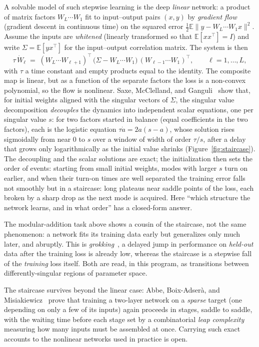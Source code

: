 A solvable model of such stepwise learning is the deep \emph{linear} network: a product of matrix factors $W_L\cdots W_1$ fit to input--output pairs $(x,y)$ by \emph{gradient flow} (gradient descent in continuous time) on the squared error $\tfrac12\mathbb{E}\|y-W_L\cdots W_1x\|^2$. Assume the inputs are \emph{whitened} (linearly transformed so that $\mathbb{E}[xx^\top]=I$) and write $\Sigma=\mathbb{E}[yx^\top]$ for the input--output correlation matrix. The system is then
\[
   \tau\,\dot W_\ell \;=\; (W_L\cdots W_{\ell+1})^{\top}\,\bigl(\Sigma-W_L\cdots W_1\bigr)\,(W_{\ell-1}\cdots W_1)^{\top},\qquad \ell=1,\dots,L,
\]
with $\tau$ a time constant and empty products equal to the identity. The composite map is linear, but as a function of the separate factors the loss is a non-convex polynomial, so the flow is nonlinear. Saxe, McClelland, and Ganguli~\cite{saxe2014} show that, for initial weights aligned with the singular vectors of $\Sigma$, the singular value decomposition \emph{decouples} the dynamics into independent scalar equations, one per singular value $s$: for two factors started in balance (equal coefficients in the two factors), each is the logistic equation $\tau\dot a=2a(s-a)$, whose solution rises sigmoidally from near $0$ to $s$ over a window of width of order $\tau/s$, after a delay that grows only logarithmically as the initial value shrinks (Figure~\ref{fig:staircase}). The decoupling and the scalar solutions are exact; the initialization then sets the order of events: starting from small initial weights, modes with larger $s$ turn on earlier, and when their turn-on times are well separated the training error falls not smoothly but in a staircase: long plateaus near saddle points of the loss, each broken by a sharp drop as the next mode is acquired. Here ``which structure the network learns, and in what order'' has a closed-form answer.

The modular-addition task above shows a cousin of the staircase, not the same phenomenon: a network fits its training data early but generalizes only much later, and abruptly. This is \emph{grokking}~\cite{nanda2023}, a delayed jump in performance on \emph{held-out} data after the training loss is already low, whereas the staircase is a stepwise fall of the \emph{training} loss itself. Both are read, in this program, as transitions between differently-singular regions of parameter space.

The staircase survives beyond the linear case: Abbe, Boix-Adser\`a, and Misiakiewicz~\cite{abbe2023} prove that training a two-layer network on a \emph{sparse} target (one depending on only a few of its inputs) again proceeds in stages, saddle to saddle, with the waiting time before each stage set by a combinatorial \emph{leap complexity} measuring how many inputs must be assembled at once. Carrying such exact accounts to the nonlinear networks used in practice is open.

